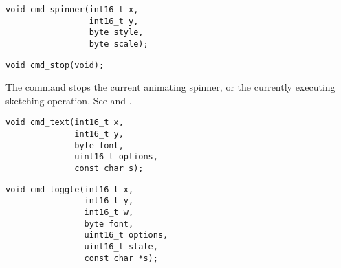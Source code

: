 
\begin{framed}
\begin{verbatim}
void cmd_spinner(int16_t x,
                 int16_t y,
                 byte style,
                 byte scale);
\end{verbatim}
\end{framed}

\vspace{20pt}


\begin{framed}
\begin{verbatim}
void cmd_stop(void);
\end{verbatim}
\end{framed}

The  command stops the current animating spinner,
or the currently executing sketching operation.
See  and
.




\begin{framed}
\begin{verbatim}
void cmd_text(int16_t x,
              int16_t y,
              byte font,
              uint16_t options,
              const char s);
\end{verbatim}
\end{framed}




\begin{framed}
\begin{verbatim}
void cmd_toggle(int16_t x,
                int16_t y,
                int16_t w,
                byte font,
                uint16_t options,
                uint16_t state,
                const char *s);
\end{verbatim}
\end{framed}

